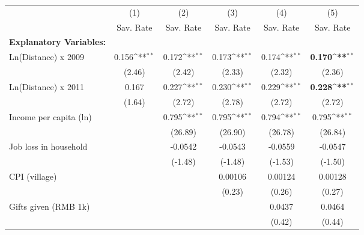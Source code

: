{
\def\sym#1{\ifmmode^{#1}\else\(^{#1}\)\fi}
\begin{tabular}{l*{5}{c}}
\hline\hline
                    &\multicolumn{1}{c}{(1)}&\multicolumn{1}{c}{(2)}&\multicolumn{1}{c}{(3)}&\multicolumn{1}{c}{(4)}&\multicolumn{1}{c}{(5)}\\
                    &\multicolumn{1}{c}{Sav. Rate}&\multicolumn{1}{c}{Sav. Rate}&\multicolumn{1}{c}{Sav. Rate}&\multicolumn{1}{c}{Sav. Rate}&\multicolumn{1}{c}{Sav. Rate}\\
\hline
\textbf{Explanatory Variables:}&                    &                    &                    &                    &                    \\
Ln(Distance) x 2009 &       0.156\sym{**}&       0.172\sym{**}&       0.173\sym{**}&       0.174\sym{**}&       \textbf{0.170\sym{**}}\\
                    &      (2.46)        &      (2.42)        &      (2.33)        &      (2.32)        &      (2.36)        \\
Ln(Distance) x 2011 &       0.167        &       0.227\sym{**}&       0.230\sym{**}&       0.229\sym{**}&       \textbf{0.228\sym{**}}\\
                    &      (1.64)        &      (2.72)        &      (2.78)        &      (2.72)        &      (2.72)        \\
Income per capita (ln)&                    &       0.795\sym{**}&       0.795\sym{**}&       0.794\sym{**}&       0.795\sym{**}\\
                    &                    &     (26.89)        &     (26.90)        &     (26.78)        &     (26.84)        \\
Job loss in household&                    &     -0.0542        &     -0.0543        &     -0.0559        &     -0.0547        \\
                    &                    &     (-1.48)        &     (-1.48)        &     (-1.53)        &     (-1.50)        \\
CPI (village)       &                    &                    &     0.00106        &     0.00124        &     0.00128        \\
                    &                    &                    &      (0.23)        &      (0.26)        &      (0.27)        \\
Gifts given (RMB 1k)&                    &                    &                    &      0.0437        &      0.0464        \\
                    &                    &                    &                    &      (0.42)        &      (0.44)        \\

\end{tabular}}
